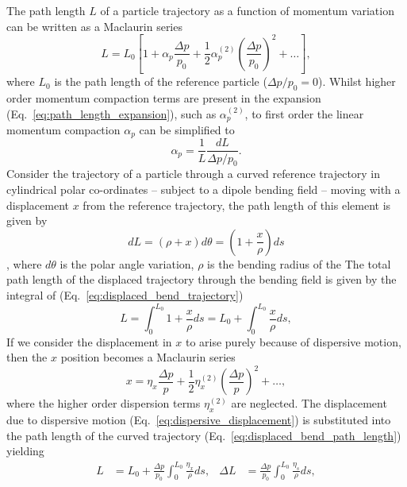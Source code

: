 \documentclass[../main.tex]{subfiles}
\begin{document}
The path length $L$ of a particle trajectory as a function of momentum variation can be written as a Maclaurin series \cite{wolski2012longitudinal}
\begin{equation}
L = L_{0}\left[1+\alpha_{p}\frac{\Delta p}{p_{0}}+\frac{1}{2}\alpha_{p}^{\left(2\right)}\left(\frac{\Delta p}{p_{0}}\right)^{2}+\ldots\right],
\label{eq:path_length_expansion}    
\end{equation}
where $L_{0}$ is the path length of the reference particle ($\Delta p/p_{0}=0$). Whilst higher order momentum compaction terms are present in the expansion (Eq.~\ref{eq:path_length_expansion}), such as $\alpha_{p}^{\left(2\right)}$, to first order the linear momentum compaction $\alpha_{p}$ can be simplified to
\begin{equation}
\alpha_{p} = \frac{1}{L}\frac{dL}{\Delta p/p_{0}}.
\label{eq:momentum_compaction_first_order}    
\end{equation}
Consider the trajectory of a particle through a curved reference trajectory in cylindrical polar co-ordinates -- subject to a dipole bending field -- moving with a displacement $x$ from the reference trajectory, the path length of this element is given by
\begin{equation}
dL = \left(\rho+x\right)d\theta = \left(1+\frac{x}{\rho}\right)ds
\label{eq:displaced_bend_trajectory}    
\end{equation},
where $d\theta$ is the polar angle variation, $\rho$ is the bending radius of the 
The total path length of the displaced trajectory through the bending field is given by the integral of (Eq.~\ref{eq:displaced_bend_trajectory})
\begin{equation}
L = \int_{0}^{L_{0}} 1+\frac{x}{\rho} ds = L_{0} + \int_{0}^{L_{0}}\frac{x}{\rho}ds, 
\label{eq:displaced_bend_path_length}    
\end{equation}
If we consider the displacement in $x$ to arise purely because of dispersive motion, then the $x$ position becomes a Maclaurin series
\begin{equation}
x = \eta_{x}\frac{\Delta p}{p} + \frac{1}{2}\eta_{x}^{\left(2\right)}\left(\frac{\Delta p}{p}\right)^{2}+\ldots,
\label{eq:dispersive_displacement}    
\end{equation}
where the higher order dispersion terms $\eta_{x}^{\left(2\right)}$ are neglected. The displacement due to dispersive motion (Eq.~\ref{eq:dispersive_displacement}) is substituted into the path length of the curved trajectory (Eq.~\ref{eq:displaced_bend_path_length}) yielding
\begin{align}
L &= L_{0} + \frac{\Delta p}{p_{0}}\int_{0}^{L_{0}}\frac{\eta_{x}}{\rho}ds, &
\Delta L &= \frac{\Delta p}{p_{0}}\int_{0}^{L_{0}}\frac{\eta_{s}}{\rho}ds,
\label{eq:dispersive_path_length_variation}
\end{align}
\end{document}
